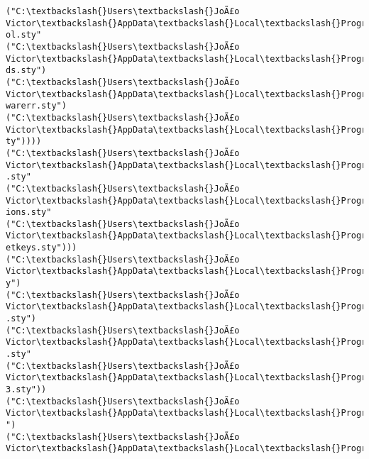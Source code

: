 \documentclass[11pt]{article}
\begin{document}
\begin{Verbatim}[commandchars=\\\{\}]
("C:\textbackslash{}Users\textbackslash{}JoÃ£o Victor\textbackslash{}AppData\textbackslash{}Local\textbackslash{}Programs\textbackslash{}MiKTeX\textbackslash{}tex/generic/oberdiek\textbackslash{}pdfc
ol.sty"
("C:\textbackslash{}Users\textbackslash{}JoÃ£o Victor\textbackslash{}AppData\textbackslash{}Local\textbackslash{}Programs\textbackslash{}MiKTeX\textbackslash{}tex/generic/ltxcmds\textbackslash{}ltxcm
ds.sty")
("C:\textbackslash{}Users\textbackslash{}JoÃ£o Victor\textbackslash{}AppData\textbackslash{}Local\textbackslash{}Programs\textbackslash{}MiKTeX\textbackslash{}tex/generic/infwarerr\textbackslash{}inf
warerr.sty")
("C:\textbackslash{}Users\textbackslash{}JoÃ£o Victor\textbackslash{}AppData\textbackslash{}Local\textbackslash{}Programs\textbackslash{}MiKTeX\textbackslash{}tex/generic/iftex\textbackslash{}iftex.s
ty"))))
("C:\textbackslash{}Users\textbackslash{}JoÃ£o Victor\textbackslash{}AppData\textbackslash{}Local\textbackslash{}Programs\textbackslash{}MiKTeX\textbackslash{}tex/latex/parskip\textbackslash{}parskip
.sty"
("C:\textbackslash{}Users\textbackslash{}JoÃ£o Victor\textbackslash{}AppData\textbackslash{}Local\textbackslash{}Programs\textbackslash{}MiKTeX\textbackslash{}tex/latex/kvoptions\textbackslash{}kvopt
ions.sty"
("C:\textbackslash{}Users\textbackslash{}JoÃ£o Victor\textbackslash{}AppData\textbackslash{}Local\textbackslash{}Programs\textbackslash{}MiKTeX\textbackslash{}tex/generic/kvsetkeys\textbackslash{}kvs
etkeys.sty")))
("C:\textbackslash{}Users\textbackslash{}JoÃ£o Victor\textbackslash{}AppData\textbackslash{}Local\textbackslash{}Programs\textbackslash{}MiKTeX\textbackslash{}tex/latex/base\textbackslash{}fontenc.st
y")
("C:\textbackslash{}Users\textbackslash{}JoÃ£o Victor\textbackslash{}AppData\textbackslash{}Local\textbackslash{}Programs\textbackslash{}MiKTeX\textbackslash{}tex/latex/psnfss\textbackslash{}mathpazo
.sty")
("C:\textbackslash{}Users\textbackslash{}JoÃ£o Victor\textbackslash{}AppData\textbackslash{}Local\textbackslash{}Programs\textbackslash{}MiKTeX\textbackslash{}tex/latex/caption\textbackslash{}caption
.sty"
("C:\textbackslash{}Users\textbackslash{}JoÃ£o Victor\textbackslash{}AppData\textbackslash{}Local\textbackslash{}Programs\textbackslash{}MiKTeX\textbackslash{}tex/latex/caption\textbackslash{}caption
3.sty"))
("C:\textbackslash{}Users\textbackslash{}JoÃ£o Victor\textbackslash{}AppData\textbackslash{}Local\textbackslash{}Programs\textbackslash{}MiKTeX\textbackslash{}tex/latex/float\textbackslash{}float.sty
")
("C:\textbackslash{}Users\textbackslash{}JoÃ£o Victor\textbackslash{}AppData\textbackslash{}Local\textbackslash{}Programs\textbackslash{}MiKTeX\textbackslash{}tex/latex/tools\textbackslash{}enumerate

\end{Verbatim}
\end{document}
